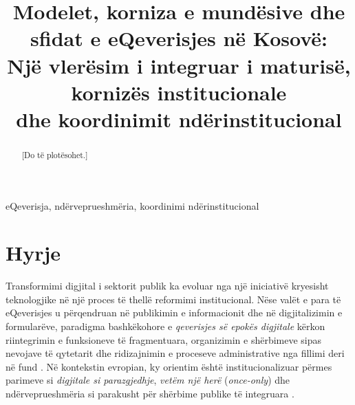 \documentclass[conference]{IEEEtran}
\begin{document}
\title{Modelet, korniza e mundësive dhe sfidat e eQeverisjes në Kosovë:\\
Një vlerësim i integruar i maturisë, kornizës institucionale\\
dhe koordinimit ndërinstitucional}

\author{
}

\maketitle

\begin{abstract}
[Do të plotësohet.]
\end{abstract}

\begin{IEEEkeywords}
eQeverisja, ndërveprueshmëria, koordinimi ndërinstitucional
\end{IEEEkeywords}

\section{Hyrje}
\label{sec:hyrje}

Transformimi digjital i sektorit publik ka evoluar nga një iniciativë
kryesisht teknologjike në një proces të thellë reformimi institucional.
Nëse valët e para të eQeverisjes u përqendruan në publikimin e
informacionit dhe në digjitalizimin e formularëve, paradigma bashkëkohore
e \textit{qeverisjes së epokës digjitale} kërkon riintegrimin e
funksioneve të fragmentuara, organizimin e shërbimeve sipas nevojave të
qytetarit dhe ridizajnimin e proceseve administrative nga fillimi deri në
fund \cite{dunleavy2006,mergel2019}. Në kontekstin evropian, ky orientim
është institucionalizuar përmes parimeve si \textit{digjitale si
parazgjedhje}, \textit{vetëm një herë} (\textit{once-only}) dhe
ndërveprueshmëria si parakusht për shërbime publike të integruara
\cite{eif2017}.
\end{document}
